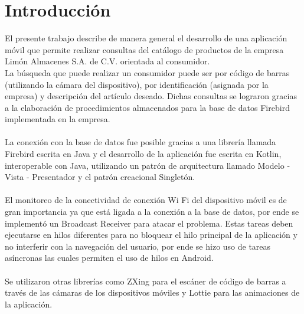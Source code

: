 \chapter*{Introducción}

El presente trabajo describe de manera general el desarrollo de una aplicación móvil que permite realizar consultas del catálogo de productos de la empresa Limón Almacenes S.A. de C.V. orientada al consumidor.
\\
La búsqueda que puede realizar un consumidor puede ser por código de barras (utilizando la cámara del dispositivo), por identificación (asignada por la empresa) y descripción del artículo deseado. Dichas consultas se lograron gracias a la elaboración de procedimientos almacenados para la base de datos Firebird implementada en la empresa.
\\ \\
La conexión con la base de datos fue posible gracias a una librería llamada Firebird escrita en Java y el desarrollo de la aplicación fue escrita en Kotlin, interoperable con Java, utilizando un patrón de arquitectura llamado Modelo - Vista - Presentador y el patrón creacional Singletón.
\\ \\
El monitoreo de la conectividad de conexión Wi Fi del dispositivo móvil es de gran importancia ya que está ligada a la conexión a la base de datos, por ende se implementó un Broadcast Receiver para atacar el problema. Estas tareas deben ejecutarse en hilos diferentes para no bloquear el hilo principal de la aplicación y no interferir con la navegación del usuario, por ende se hizo uso de tareas asíncronas las cuales permiten el uso de hilos en Android.
\\ \\
Se utilizaron otras librerías como ZXing para el escáner de código de barras a través de las cámaras de los dispositivos móviles y Lottie para las animaciones de la aplicación.